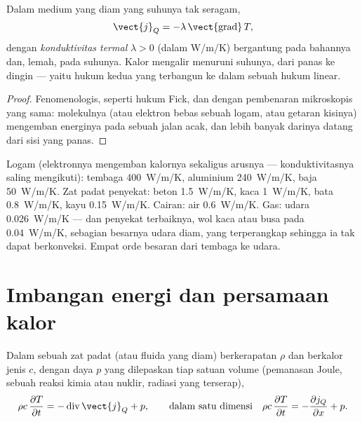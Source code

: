 \begin{theorem}\label{thm:b2:heat-conduction:fourier}
Dalam medium yang diam yang suhunya tak seragam,
\[
\vect{j}_Q = -\lambda\,\vect{\operatorname{grad}}\,T ,
\]
dengan \emph{konduktivitas termal}
$\lambda > 0$ (dalam \unit{W/m/K}) bergantung pada bahannya dan, lemah, pada
suhunya. Kalor mengalir menuruni  suhunya, dari panas ke
dingin --- yaitu hukum kedua yang terbangun ke dalam sebuah hukum linear.
\end{theorem}

\begin{proof}
Fenomenologis, seperti hukum Fick, dan dengan pembenaran mikroskopis
yang sama: molekulnya (atau elektron bebas sebuah logam, atau
getaran kisinya) mengemban energinya pada sebuah jalan acak, dan lebih banyak
darinya datang dari sisi yang panas.
\end{proof}

\begin{example}[Konduktivitas]\label{ex:b2:heat-conduction:values}
Logam (elektronnya mengemban kalornya sekaligus arusnya ---
konduktivitasnya saling mengikuti): tembaga \qty{400}{W/m/K}, aluminium
\qty{240}{W/m/K}, baja \qty{50}{W/m/K}. Zat padat penyekat: beton
\qty{1.5}{W/m/K}, kaca \qty{1}{W/m/K}, bata \qty{0.8}{W/m/K}, kayu
\qty{0.15}{W/m/K}. Cairan: air \qty{0.6}{W/m/K}. Gas: udara
\qty{0.026}{W/m/K} --- dan penyekat terbaiknya, wol kaca atau busa pada
\qty{0.04}{W/m/K}, sebagian besarnya udara diam, yang terperangkap sehingga ia tak dapat
berkonveksi. Empat orde besaran dari tembaga ke udara.
\end{example}

\section{Imbangan energi dan persamaan kalor}

\begin{theorem}\label{thm:b2:heat-conduction:balance}
Dalam sebuah zat padat (atau fluida yang diam) berkerapatan $\rho$ dan berkalor jenis
$c$, dengan daya $p$ yang dilepaskan tiap satuan volume (pemanasan Joule, sebuah
reaksi kimia atau nuklir, radiasi yang terserap),
\[
\rho c\,\frac{\partial T}{\partial t} = -\operatorname{div}\vect{j}_Q + p ,
\qquad\text{dalam satu dimensi}\quad
\rho c\,\frac{\partial T}{\partial t} = -\frac{\partial j_Q}{\partial x} + p .
\]
\end{theorem}

